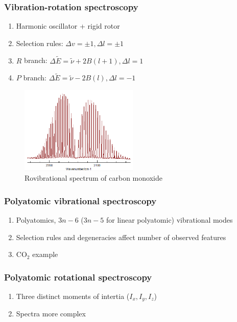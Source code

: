 \documentclass[11pt]{article}
\begin{document}
\subsubsection{Vibration-rotation spectroscopy}
\label{sec:orgad3ca95}
\begin{enumerate}
\item Harmonic oscillator + rigid rotor
\item Selection rules: \(\Delta v = \pm 1, \Delta l=\pm 1\)
\item \(R\) branch: \(\Delta \tilde E  = \tilde \nu + 2B(l+1), \Delta l = 1\)
\item \(P\) branch: \(\Delta \tilde E = \tilde \nu - 2B(l), \Delta l = -1\)
\end{enumerate}
\begin{figure}[htbp]
\centering
\includegraphics[width=0.5\textwidth]{./Images/CO-rovib.png}
\caption{Rovibrational spectrum of carbon monoxide}
\end{figure}
\subsubsection{Polyatomic vibrational spectroscopy}
\label{sec:org1c2db4a}
\begin{enumerate}
\item Polyatomics, \(3n-6\) (\(3n-5\) for linear polyatomic) vibrational modes
\item Selection rules and degeneracies affect number of observed features
\item CO\(_2\) example
\end{enumerate}
\subsubsection{Polyatomic rotational spectroscopy}
\label{sec:org61146d7}
\begin{enumerate}
\item Three distinct moments of intertia (\(I_x, I_y, I_z\))
\item Spectra more complex
\end{enumerate}
\end{document}
